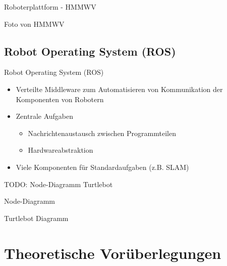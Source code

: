\documentclass[18pt]{beamer}
\begin{document}
\begin{frame}{Roboterplattform - HMMWV}
	\begin{center}
		Foto von HMMWV
	\end{center}
\end{frame}


\subsection{Robot Operating System (ROS)}
\begin{frame}{Robot Operating System (ROS)}
	\begin{itemize}
		\item Verteilte Middleware zum Automatisieren von Kommunikation der Komponenten von Robotern
		\item Zentrale Aufgaben
		\begin{itemize}
			\item Nachrichtenaustausch zwischen Programmteilen
			\item Hardwareabstraktion
		\end{itemize}
		\item Viele Komponenten für Standardaufgaben (z.B. SLAM)
	\end{itemize}
	TODO: Node-Diagramm Turtlebot
\end{frame}

\begin{frame}{Node-Diagramm}
	\begin{center}
		Turtlebot Diagramm
	\end{center}
\end{frame}



\section{Theoretische Vorüberlegungen}
\end{document}
